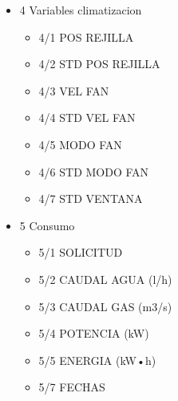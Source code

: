 \begin{multicols}{2} 
\begin{flushleft} 
\begin{itemize}
\item{4 Variables climatizacion}
\begin{itemize}
\item{4/1 POS REJILLA}
\item{4/2 STD POS REJILLA}
\item{4/3 VEL FAN}
\item{4/4 STD VEL FAN}
\item{4/5 MODO FAN}
\item{4/6 STD MODO FAN}
\item{4/7 STD VENTANA}
\end{itemize} 
\end{itemize} 
\end{flushleft}

\begin{flushright} 
\begin{itemize}
\item{5 Consumo}
\begin{itemize}
\item{5/1 SOLICITUD}
\item{5/2 CAUDAL AGUA (l/h)}
\item{5/3 CAUDAL GAS (m3/s)}
\item{5/4 POTENCIA (kW)}
\item{5/5 ENERGIA (kW•h)}
\item{5/7 FECHAS}
\end{itemize} 
\end{itemize} 
\end{flushright} 
\end{multicols} 

